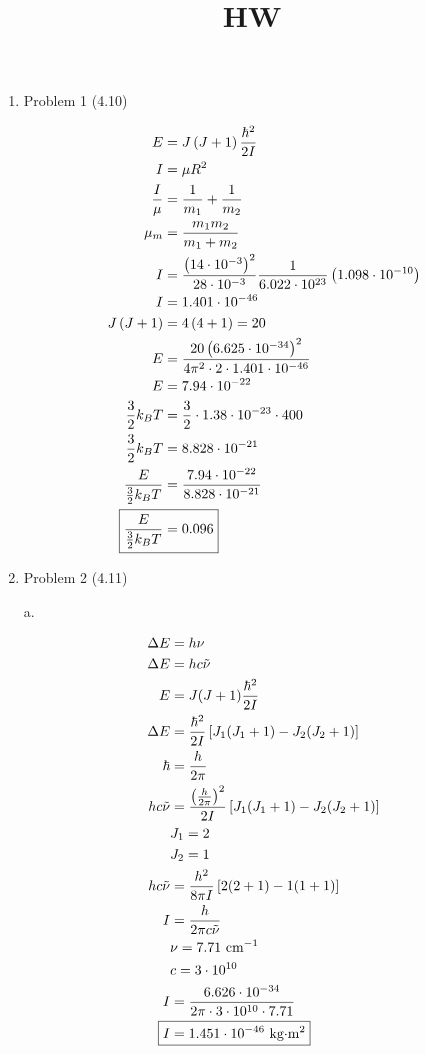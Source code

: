 \documentclass[12pt]{article}
\title{HW}
\date{}
\begin{document}
\begin{enumerate}

    \newpage
    \item Problem 1 (4.10)
    
    \begin{align*}
        E &= J \left(J+1\right) \frac{\hbar^2}{2I} \\
        I &= \mu R^2 \\
        \frac{I}{\mu} &= \frac{1}{m_1} + \frac{1}{m_2} \\
        \mu_m &= \frac{m_1m_2}{m_1+m_2} \\
        I &= \frac{\left(14 \cdot 10^{-3}\right)^2}{28\cdot10^{-3}} \frac{1}{6.022\cdot10^{23}} \left(1.098\cdot10^{-10}\right) \\
        I &= 1.401\cdot10^{-46} \\
        J \left(J+1\right) &= 4 \left(4+1\right) = 20 \\
        E &= \frac{20 \left(6.625\cdot10^{-34}\right)^2}{4\pi^2\cdot2\cdot1.401\cdot10^{-46}} \\
        E &= 7.94\cdot10^{-22} \\
        \frac{3}{2}k_BT &= \frac{3}{2} \cdot 1.38\cdot10^{-23} \cdot 400 \\
        \frac{3}{2}k_BT &= 8.828\cdot10^{-21} \\
        \frac{E}{\frac{3}{2}k_BT} &= \frac{7.94\cdot10^{-22}}{8.828\cdot10^{-21}} \\
        \Aboxed{\frac{E}{\frac{3}{2}k_BT} &= 0.096}
    \end{align*}

    \newpage
    \item Problem 2 (4.11)
    
    a.
    
    \begin{align*}
        \Delta E &= h\nu \\
        \Delta E &= hc\tilde{\nu} \\
        E &= J(J+1)\frac{\hbar^2}{2I} \\
        \Delta E &= \frac{\hbar^2}{2I} \left[J_1(J_1+1)-J_2(J_2+1)\right] \\
        \hbar &= \frac{h}{2\pi} \\
        hc\tilde{\nu} &= \frac{\left(\frac{h}{2\pi}\right)^2}{2I} \left[J_1(J_1+1)-J_2(J_2+1)\right] \\
        & J_1 = 2 \\
        & J_2 = 1 \\
        hc\tilde{\nu} &= \frac{h^2}{8\pi I} \left[2(2+1)-1(1+1)\right] \\
        I &= \frac{h}{2\pi c\tilde{\nu}} \\
        & \nu = 7.71 \text{ cm$^{-1}$} \\
        & c = 3\cdot10^{10} \\
        I &= \frac{6.626\cdot10^{-34}}{2\pi \cdot 3\cdot10^{10} \cdot 7.71} \\
        \Aboxed{I &= 1.451\cdot10^{-46} \text{ kg$\cdot$m$^2$}}
    \end{align*}


\end{enumerate}
\end{document}
